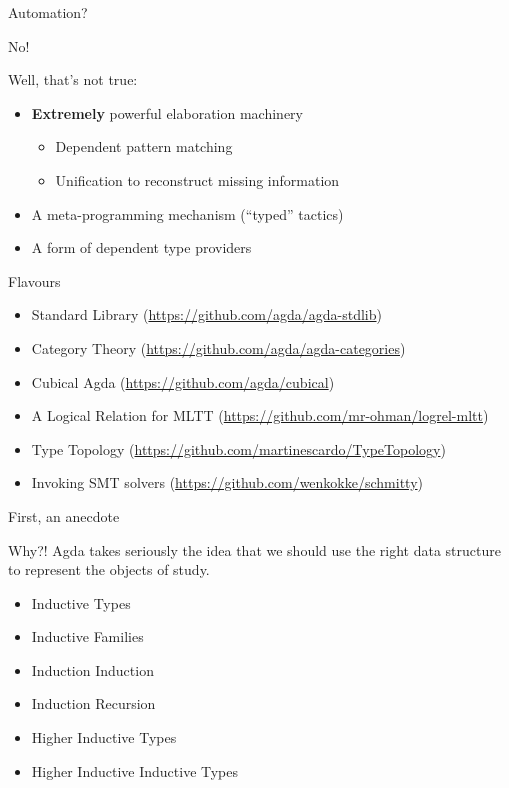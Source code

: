 \documentclass{beamer}
\begin{document}
\begin{frame}{Automation?}
  \begin{center}
    \Huge No!
  \end{center}

\vfill
Well, that's not true:
\begin{itemize}
  \item \textbf{Extremely} powerful elaboration machinery
    \begin{itemize}
      \item Dependent pattern matching
      \item Unification to reconstruct missing information
    \end{itemize}
  \item A meta-programming mechanism (``typed'' tactics)
  \item A form of dependent type providers
\end{itemize}
\end{frame}

\begin{frame}{Flavours}
  \begin{itemize}
    \item Standard Library (\url{https://github.com/agda/agda-stdlib})
    \item Category Theory (\url{https://github.com/agda/agda-categories})
    \item Cubical Agda (\url{https://github.com/agda/cubical})
    \item A Logical Relation for MLTT (\url{https://github.com/mr-ohman/logrel-mltt})
    \item Type Topology (\url{https://github.com/martinescardo/TypeTopology})
    \item Invoking SMT solvers (\url{https://github.com/wenkokke/schmitty})
  \end{itemize}
\end{frame}

\begin{frame}{First, an anecdote}
\end{frame}

\begin{frame}{Why?!}
  Agda takes seriously the idea that we should use the
  right data structure to represent the objects of study.

  \begin{itemize}
    \item Inductive Types
    \item Inductive Families
    \item Induction Induction
    \item Induction Recursion
    \item Higher Inductive Types
    \item Higher Inductive Inductive Types
  \end{itemize}
\end{frame}
\end{document}
